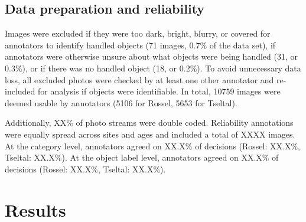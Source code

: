 \documentclass[10pt, letterpaper]{article}
\begin{document}
\hypertarget{data-preparation-and-reliability}{%
\subsection{Data preparation and
reliability}\label{data-preparation-and-reliability}}

Images were excluded if they were too dark, bright, blurry, or covered
for annotators to identify handled objects (71 images, 0.7\% of the data
set), if annotators were otherwise unsure about what objects were being
handled (31, or 0.3\%), or if there was no handled object (18, or
0.2\%). To avoid unnecessary data loss, all excluded photos were checked
by at least one other annotator and re-included for analysis if objects
were identifiable. In total, 10759 images were deemed usable by
annotators (5106 for Rossel, 5653 for Tseltal).

Additionally, XX\% of photo streams were double coded. Reliability
annotations were equally spread across sites and ages and included a
total of XXXX images. At the category level, annotators agreed on XX.X\%
of decisions (Rossel: XX.X\%, Tseltal: XX.X\%). At the object label
level, annotators agreed on XX.X\% of decisions (Rossel: XX.X\%,
Tseltal: XX.X\%).

\begin{table}[!ht]
\centering
{}
\caption{Non-study-related objects handled by the most children across categories and sites.} 
\label{tab:top-objects}
\end{table}

\hypertarget{results}{%
\section{Results}\label{results}}
\end{document}
